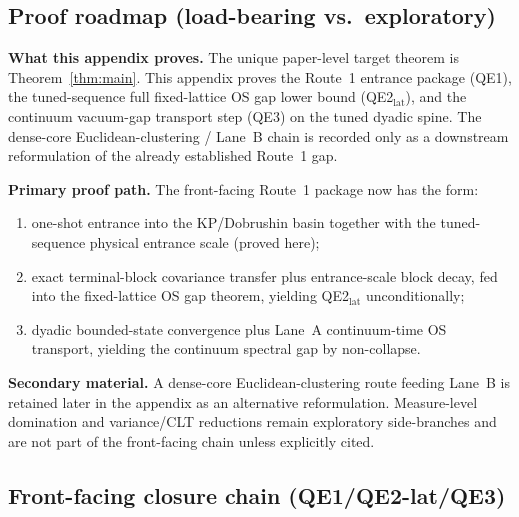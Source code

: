 \subsection*{Proof roadmap (load-bearing vs.\ exploratory)}\label{sec:massgap_roadmap}

\noindent\textbf{What this appendix proves.}
The unique paper-level target theorem is Theorem~\ref{thm:main}.
This appendix proves the Route~1 entrance package (QE1), the tuned-sequence full fixed-lattice OS gap lower bound (QE2$_{\mathrm{lat}}$), and the continuum vacuum-gap transport step (QE3) on the tuned dyadic spine.
The dense-core Euclidean-clustering / Lane~B chain is recorded only as a downstream reformulation of the already established Route~1 gap.

\medskip
\noindent\textbf{Primary proof path.}
The front-facing Route~1 package now has the form:
\begin{enumerate}[leftmargin=*]
\item one-shot entrance into the KP/Dobrushin basin together with the tuned-sequence physical entrance scale (proved here);
\item exact terminal-block covariance transfer plus entrance-scale block decay, fed into the fixed-lattice OS gap theorem, yielding QE2$_{\mathrm{lat}}$ unconditionally;
\item dyadic bounded-state convergence plus Lane~A continuum-time OS transport, yielding the continuum spectral gap by non-collapse.
\end{enumerate}

\medskip
\noindent\textbf{Secondary material.}
A dense-core Euclidean-clustering route feeding Lane~B is retained later in the appendix as an alternative reformulation.
Measure-level domination and variance/CLT reductions remain exploratory side-branches and are not part of the front-facing chain unless explicitly cited.


\subsection{Front-facing closure chain (QE1/QE2-lat/QE3)}
\label{sec:main_theorem_package}


